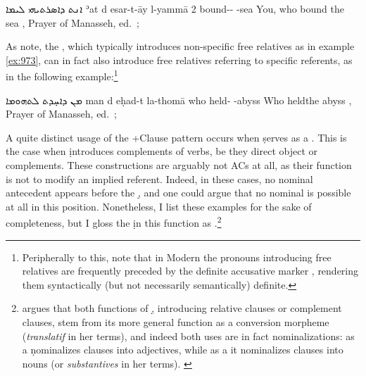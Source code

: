 {{  
  {ܐܢܬ ܕܐܣܪܬܝܗܝ ܠܝܡܐ}
  {ʾat d\cb{} esar-t-āy l-yammā}
  {2\masc{} \lnk\cb{} bound-\masc{}-\masc{} \acc-sea}
  {You, who bound the sea}
  {\Pesh, Prayer of Manasseh, ed.\ \cite[B3]{BaarsSchneider}; \cite[221 (3a)]{GutmanVanPeursen}}
  
\largerpage[-1]
  As \citet[87]{GutmanVanPeursen} note, the  , which typically introduces non-specific free relatives as in example \ref{ex:973}, can in fact also introduce free relatives referring to specific referents, as in the following example:\footnote{Peripherally to this, note that in Modern  the pronouns introducing free relatives are frequently preceded by the definite accusative marker , rendering them syntactically (but not necessarily semantically) definite.}
  
  {ܡܢ ܕܐܚ̣ܕܬ ܠܬܗܘܡܐ}
  {man d\cb{} eḥad-t la-thomā}
  {who \lnk\cb{} held-\masc{} \acc-abyss}
  {Who held\footnotemark the abyss}
  {\Pesh, Prayer of Manasseh, ed.\ \cite[B3]{BaarsSchneider}; \cite[221 (3b)]{GutmanVanPeursen}}
  

\largerpage[2]
  A quite distinct usage of the \D+Clause pattern occurs when \d serves as a . This is the case when \d introduces complements of verbs, be they direct object or  complements. 
   These constructions are arguably not ACs at all, as their function is not to modify an implied referent. Indeed, in these cases, no nominal antecedent appears before the \d, and one could argue that no nominal \prim is possible at all in this position. Nonetheless, I list these examples for the sake of completeness, but I gloss the \d in this function as \lnkcomp.\footnote{\citet[275]{WertheimerFunctions} argues that both functions of \d, introducing relative clauses or complement clauses, stem from its more general function as a conversion morpheme (\textit{translatif} in her terms), and indeed both uses are in fact nominalizations: as a  \d nominalizes clauses into adjectives, while as a \comp* it nominalizes clauses into nouns (or \textit{substantives} in her terms). \label{ft:Wertheimer_complement} }
  
}}
